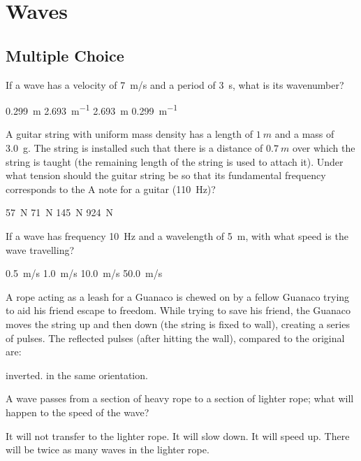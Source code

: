 \section{Waves}

\subsection{Multiple Choice}

\question If a wave has a velocity of \SI{7}{m/s} and a period of \SI{3}{s}, what is its wavenumber?
\begin{checkboxes}
\choice \SI{0.299}{m}
\choice \SI{2.693}{m^{-1}}
\choice \SI{2.693}{m}
\CorrectChoice \SI{0.299}{m^{-1}} \correct
\end{checkboxes}

\question A guitar string with uniform mass density has a length of $\SI{1}{m}$ and a mass of \SI{3.0}{g}. The string is installed such that there is a distance of $\SI{0.7}{m}$ over which the string is taught (the remaining length of the string is used to attach it). Under what tension should the guitar string be so that its fundamental frequency corresponds to the A note for a guitar (\SI{110}{Hz})? 
\begin{checkboxes}
	\choice \SI{57}{N}
	\CorrectChoice \SI{71}{N}
	\choice \SI{145}{N}
	\choice \SI{924}{N}
\end{checkboxes}

\question  If a wave has frequency \SI{10}{Hz} and a wavelength of \SI{5}{m}, with what speed is the wave travelling?
\begin{checkboxes}
	\choice \SI{0.5}{m/s}
	\choice \SI{1.0}{m/s}
	\choice \SI{10.0}{m/s}
	\CorrectChoice \SI{50.0}{m/s} 
\end{checkboxes}

\question A rope acting as a leash for a Guanaco is chewed on by a fellow Guanaco trying to aid his friend escape to freedom.  While trying to save his friend, the Guanaco moves the string up and then down (the string is fixed to wall), creating a series of pulses.  The reflected pulses (after hitting the wall), compared to the original are:
\begin{checkboxes}
	\CorrectChoice inverted.
	\choice in the same orientation.
\end{checkboxes}

\question[1] A wave passes from a section of heavy rope to a section of lighter rope; what will happen to the speed of the wave?
\begin{checkboxes}
	\choice It will not transfer to the lighter rope.
	\choice It will slow down.
	\CorrectChoice It will speed up.
	\choice There will be twice as many waves in the lighter rope.
\end{checkboxes}

